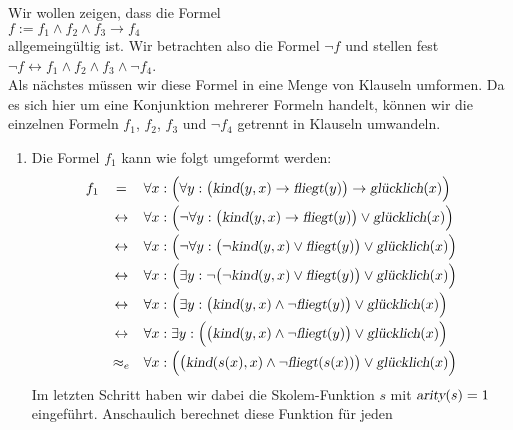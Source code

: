 Wir wollen zeigen, dass die Formel 
\\[0.2cm]
\hspace*{1.3cm} 
$f := f_1 \wedge f_2 \wedge f_3 \rightarrow f_4$ 
\\[0.2cm]
allgemeing\"{u}ltig ist.  Wir betrachten also die Formel $\neg f$ und stellen fest \\[0.2cm]
\hspace*{1.3cm} $\neg f \leftrightarrow f_1 \wedge f_2 \wedge f_3 \wedge \neg f_4$. \\[0.2cm]
Als n\"{a}chstes m\"{u}ssen wir diese Formel in eine Menge von Klauseln umformen.
Da es sich hier um eine Konjunktion mehrerer Formeln handelt, k\"{o}nnen wir 
die einzelnen Formeln 
 $f_1$, $f_2$, $f_3$ und  $\neg f_4$  getrennt in Klauseln umwandeln.
\begin{enumerate}
\item Die Formel $f_1$ kann wie folgt umgeformt werden:
 $$ 
  \begin{array}{lcl}
    f_1 & =           & \forall x:\Bigl(\forall y: \big(\textsl{kind}(y,x)
    \rightarrow \textsl{fliegt}(y)\big) \rightarrow \textsl{gl\"{u}cklich}(x) \Bigr) \\[0.2cm]
    &\leftrightarrow & \forall x: \Bigl(\neg \forall y: \big( \textsl{kind}(y,x) \rightarrow \textsl{fliegt}(y)\big) \vee \textsl{gl\"{u}cklich}(x) \Bigr)\\[0.2cm]
    &\leftrightarrow & \forall x: \Bigl(\neg \forall y: \big( \neg \textsl{kind}(y,x) \vee \textsl{fliegt}(y)\big) \vee \textsl{gl\"{u}cklich}(x) \Bigr)\\[0.2cm]
    &\leftrightarrow & \forall x: \Bigl(\exists y: \neg \big( \neg \textsl{kind}(y,x) \vee \textsl{fliegt}(y)\big) \vee \textsl{gl\"{u}cklich}(x) \Bigr)\\[0.2cm]
    &\leftrightarrow & \forall x: \Bigl( \exists y: \big(\textsl{kind}(y,x) \wedge \neg  \textsl{fliegt}(y)\big) \vee \textsl{gl\"{u}cklich}(x) \Bigr)\\[0.2cm]
    &\leftrightarrow & \forall x:  \exists y: \Bigl(\big( \textsl{kind}(y,x) \wedge \neg  \textsl{fliegt}(y)\big) \vee \textsl{gl\"{u}cklich}(x) \Bigr)\\[0.2cm]
    &\approx_e & \forall x: \Bigl(\big( \textsl{kind}(s(x),x) \wedge \neg  \textsl{fliegt}(s(x))\big) \vee \textsl{gl\"{u}cklich}(x) \Bigr)\\
  \end{array}
     $$
      Im letzten Schritt haben wir dabei die Skolem-Funktion $s$ mit 
      $\textsl{arity}(s) = 1$ eingef\"{u}hrt.  Anschaulich berechnet diese Funktion f\"{u}r jeden

\end{enumerate}
